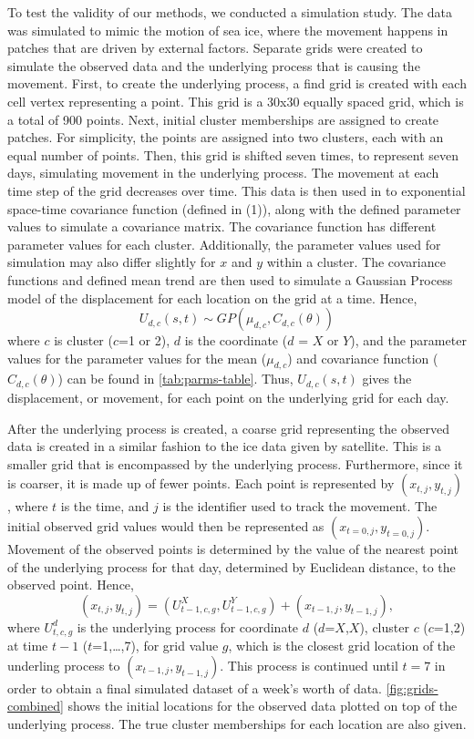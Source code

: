 \documentclass[12pt]{article}
\begin{document}
To test the validity of our methods, we conducted a simulation study.
The data was simulated to mimic the motion of sea ice, where the
movement happens in patches that are driven by external factors.
Separate grids were created to simulate the observed data and the
underlying process that is causing the movement. First, to create the
underlying process, a find grid is created with each cell vertex
representing a point. This grid is a 30x30 equally spaced grid, which is
a total of 900 points. Next, initial cluster memberships are assigned to
create patches. For simplicity, the points are assigned into two
clusters, each with an equal number of points. Then, this grid is
shifted seven times, to represent seven days, simulating movement in the
underlying process. The movement at each time step of the grid decreases
over time. This data is then used in to exponential space-time
covariance function (defined in (1)), along with the defined parameter
values to simulate a covariance matrix. The covariance function has
different parameter values for each cluster. Additionally, the parameter
values used for simulation may also differ slightly for \(x\) and \(y\)
within a cluster. The covariance functions and defined mean trend are
then used to simulate a Gaussian Process model of the displacement for
each location on the grid at a time. Hence,
\[ U_{d,c}(s,t) \sim GP(\mu_{d,c}, C_{d,c}(\theta))\] where \(c\) is
cluster (\(c\)=1 or 2), \(d\) is the coordinate (\(d\) = \(X\) or
\(Y\)), and the parameter values for the parameter values for the mean
(\(\mu_{d,c}\)) and covariance function (\(C_{d,c}(\theta)\)) can be
found in \cref{tab:parms-table}. Thus, \(U_{d,c}(s,t)\) gives the
displacement, or movement, for each point on the underlying grid for
each day.

After the underlying process is created, a coarse grid representing the
observed data is created in a similar fashion to the ice data given by
satellite. This is a smaller grid that is encompassed by the underlying
process. Furthermore, since it is coarser, it is made up of fewer
points. Each point is represented by \((x_{t,j}, y_{t,j})\), where \(t\)
is the time, and \(j\) is the identifier used to track the movement. The
initial observed grid values would then be represented as
\((x_{t=0,j}, y_{t=0,j})\). Movement of the observed points is
determined by the value of the nearest point of the underlying process
for that day, determined by Euclidean distance, to the observed point.
Hence,
\[(x_{t,j}, y_{t,j}) = (U^{X}_{t-1,c,g}, U^{Y}_{t-1,c,g}) + (x_{t-1,j}, y_{t-1,j}),\]
where \(U^d_{t,c,g}\) is the underlying process for coordinate \(d\)
(\(d\)=\(X\),\(X\)), cluster \(c\) (\(c\)=1,2) at time \(t-1\)
(\(t\)=1,\ldots,7), for grid value \(g\), which is the closest grid
location of the underling process to \((x_{t-1,j}, y_{t-1,j})\). This
process is continued until \(t=7\) in order to obtain a final simulated
dataset of a week's worth of data. \cref{fig:grids-combined} shows the
initial locations for the observed data plotted on top of the underlying
process. The true cluster memberships for each location are also given.
\end{document}
